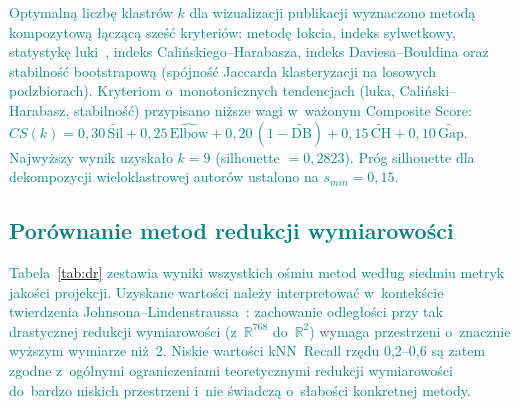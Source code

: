 \documentclass[a4paper,11pt,twocolumn]{article}
\newcommand{\hlme}[1]{\textcolor{teal}{#1}}
\begin{document}
\hlme{Optymalną liczbę klastrów $k$ dla wizualizacji publikacji wyznaczono
metodą kompozytową łączącą sześć kryteriów: metodę łokcia, indeks
sylwetkowy, statystykę luki~\cite{tibshirani2001}, indeks
Calińskiego--Harabasza, indeks Daviesa--Bouldina oraz stabilność
bootstrapową (spójność Jaccarda klasteryzacji na losowych podzbiorach).
Kryteriom o~monotonicznych tendencjach (luka, Caliński--Harabasz,
stabilność) przypisano niższe wagi w~ważonym Composite Score:
$CS(k) = 0{,}30\,\widetilde{\text{Sil}} + 0{,}25\,\widehat{\text{Elbow}}
+ 0{,}20\,(1{-}\widetilde{\text{DB}}) + 0{,}15\,\widetilde{\text{CH}}
+ 0{,}10\,\widetilde{\text{Gap}}$.
Najwyższy wynik uzyskało $k=9$
(silhouette $=0{,}2823$). Próg silhouette dla dekompozycji
wieloklastrowej autorów ustalono na $s_{min}=0{,}15$.}


\subsection{\hlme{Porównanie metod redukcji wymiarowości}}

\hlme{Tabela~\ref{tab:dr} zestawia wyniki wszystkich ośmiu metod
według siedmiu metryk jakości projekcji.
Uzyskane wartości należy interpretować w~kontekście twierdzenia
Johnsona--Lindenstraussa~\cite{johnson1984}: zachowanie odległości
przy tak drastycznej redukcji wymiarowości (z~$\mathbb{R}^{768}$
do~$\mathbb{R}^2$) wymaga przestrzeni o~znacznie wyższym wymiarze niż~2.
Niskie wartości kNN~Recall rzędu 0,2--0,6 są zatem zgodne
z~ogólnymi ograniczeniami teoretycznymi redukcji wymiarowości
do~bardzo niskich przestrzeni i~nie świadczą o~słabości konkretnej metody.}
\end{document}
